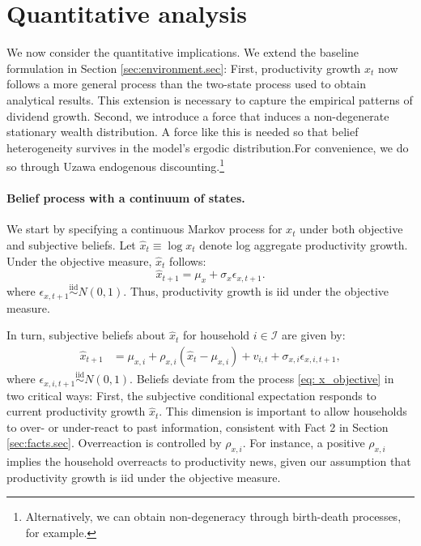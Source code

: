 \section{Quantitative analysis}\label{sec:quantitative}

We now consider the quantitative implications. We extend the baseline formulation in Section \ref{sec:environment.sec}: First, productivity growth $x_t$ now follows a more general process than the two-state process used to obtain analytical results. This extension is necessary to capture the empirical patterns of dividend growth. Second, we introduce a force that induces a non-degenerate stationary wealth distribution. A force like this is needed so that belief heterogeneity survives in the model's ergodic distribution.For convenience, we do so through Uzawa endogenous discounting.\footnote{Alternatively, we can obtain non-degeneracy through birth-death processes, for example.}  

\paragraph{Belief process with a continuum of states.}

We start by specifying a continuous Markov process for $x_t$ under both objective and subjective beliefs. 
Let $\hat{x}_{t} \equiv \log x_t $ denote log aggregate productivity growth. Under the objective measure, $\hat{x}_t$ follows:
\begin{equation}\label{eq: x_objective}
    \hat{x}_{t+1} = \mu_x +  \sigma_x \epsilon_{x,t+1}.
\end{equation}
where $\epsilon_{x,t+1} \overset{\text{iid}}{\sim} N(0,1)$. Thus, productivity growth is iid under the objective measure. 

In turn, subjective beliefs about $\hat{x}_t$ for household $i \in \mathcal{I} $ are given by:
\begin{align}
    \hat{x}_{t+1} &= \mu_{x,i} + \rho_{x,i} (\hat{x}_{t} - \mu_{x,i}) + v_{i,t} + \sigma_{x,i} \epsilon_{x,i,t+1},
\end{align}
where $\epsilon_{x,i,t+1} \overset{\text{iid}}{\sim} N(0,1)$. 
Beliefs deviate from the process \eqref{eq: x_objective} in two critical ways:
First, the subjective conditional expectation responds to current productivity growth $\hat{x}_t$. This dimension is important to allow 
households to over- or under-react to past information, consistent with Fact 2 in Section \ref{sec:facts.sec}. Overreaction is controlled by $\rho_{x,i}$. For instance, a positive $\rho_{x,i}$ implies the household overreacts to productivity news, given our assumption that productivity growth is iid under the objective measure. 

